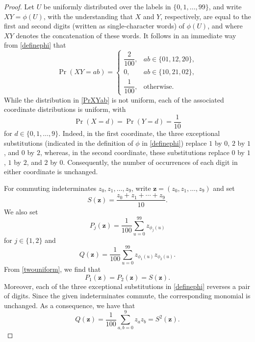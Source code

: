 \documentclass[12pt]{article}
\begin{document}
\begin{proof}
   Let $U$ be uniformly distributed over the labels in   $\{0,1,\ldots,99\}$, and write $XY=\phi(U)$,     with the understanding that $X$ and  
  $Y$, respectively, 
 are equal to the first and second digits (written as single-character words) of $\phi(U)$, 
 and where $XY$ denotes the concatenation of these words. 
 It follows in an immediate way from
\eqref{definephi} that
\begin{equation}\label{PrXYab}
 \operatorname{Pr}(XY=ab)=
 \begin{cases}
 \dfrac{2}{100}, & ab\in\{01,12,20\},\\
 0, & ab\in\{10,21,02\},\\
 \dfrac{1}{100}, & \text{otherwise.}
 \end{cases}
\end{equation}
 While the distribution in \eqref{PrXYab} 
 is not uniform, each of the associated 
 coordinate distributions is uniform, with 
\begin{equation}\label{twouniform}
 \operatorname{Pr}(X=d)=\operatorname{Pr}(Y=d)=\frac{1}{10} 
\end{equation}
 for $ d \in \{ 0, 1, \ldots, 9 \}$. 
 Indeed, in the first coordinate, the three exceptional substitutions 
 (indicated in the definition of $\phi$ in \eqref{definephi}) 
 replace $1$ by $0$, $2$ by $1$, and $0$ by $2$, whereas, in the second
coordinate, these substitutions replace $0$ by $1$, $1$ by $2$, and $2$ by $0$.
Consequently, the number of occurrences of each digit in either
coordinate is unchanged.

For commuting indeterminates $z_0,z_1,\ldots,z_9$, write
$\mathbf z=(z_0,z_1,\ldots,z_9)$ and set
\begin{equation*}
 S(\mathbf z)=\frac{z_0+z_1+\cdots+z_9}{10}.
\end{equation*}
We also set
\begin{equation*}
 P_j(\mathbf z)
 =\frac{1}{100}\sum_{u=0}^{99}z_{\phi_j(u)} 
\end{equation*}
 for $j \in \{ 1, 2 \}$
 and 
 $$ Q(\mathbf z)
 =\frac{1}{100}\sum_{u=0}^{99}
 z_{\phi_1(u)}z_{\phi_2(u)}.
 $$
 From \eqref{twouniform}, we find that 
\begin{equation}\label{singlecoordinateidentities}
 P_1(\mathbf z)=P_2(\mathbf z)=S(\mathbf z).
\end{equation}
Moreover, each of the three exceptional substitutions in
\eqref{definephi} reverses a pair of digits. Since the given 
indeterminates commute, the corresponding monomial is unchanged.
 As a consequence, we have that 
\begin{equation*}
 Q(\mathbf z)
 =\frac{1}{100}\sum_{a,b=0}^{9}z_az_b
 = S^2(\mathbf z).
\end{equation*}


\end{proof}
\end{document}
